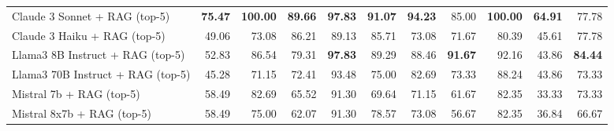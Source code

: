 \begin{table}[H]
{\begin{tabular}{lrrrrrrrrrr}
\rowcolor{Gray}
Claude 3 Sonnet + RAG (top-5) & \textbf{75.47} & \textbf{100.00} & \textbf{89.66} & \textbf{97.83} & \textbf{91.07} & \textbf{94.23} & 85.00 & \textbf{100.00} & \textbf{64.91} & 77.78 \\
\rowcolor{Gray}
Claude 3 Haiku + RAG (top-5) & 49.06 & 73.08 & 86.21 & 89.13 & 85.71 & 73.08 & 71.67 & 80.39 & 45.61 & 77.78 \\
\rowcolor{Gray}
Llama3 8B Instruct + RAG (top-5) & 52.83 & 86.54 & 79.31 & \textbf{97.83} & 89.29 & 88.46 & \textbf{91.67} & 92.16 & 43.86 & \textbf{84.44} \\
\rowcolor{Gray}
Llama3 70B Instruct + RAG (top-5) & 45.28 & 71.15 & 72.41 & 93.48 & 75.00 & 82.69 & 73.33 & 88.24 & 43.86 & 73.33 \\
\rowcolor{Gray}
Mistral 7b + RAG (top-5) & 58.49 & 82.69 & 65.52 & 91.30 & 69.64 & 71.15 & 61.67 & 82.35 & 33.33 & 73.33 \\
\rowcolor{Gray}
Mistral 8x7b + RAG (top-5) & 58.49 & 75.00 & 62.07 & 91.30 & 78.57 & 73.08 & 56.67 & 82.35 & 36.84 & 66.67 \\
\bottomrule
\end{tabular}}

\vspace{2mm}



\end{table}
